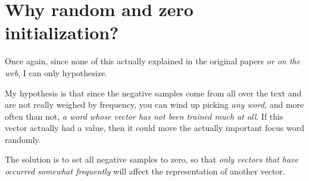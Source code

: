 \documentclass[11pt]{book}
\begin{document}
% 
% 
% 

\section{Why random and zero initialization?}

Once again, since none of this actually explained in the original papers
\emph{or on the web}, I can only hypothesize.

My hypothesis is that since the negative samples come from all over the text
and are not really weighed by frequency, you can wind up picking \emph{any word},
and more often than not, \emph{a word whose vector has not been trained much at all}.
If this vector actually had a value, then it could move the actually important
focus word randomly.

The solution is to set all negative samples to zero, so that 
\emph{only vectors that have occurred somewhat frequently} will affect the representation 
of another vector.
\end{document}
